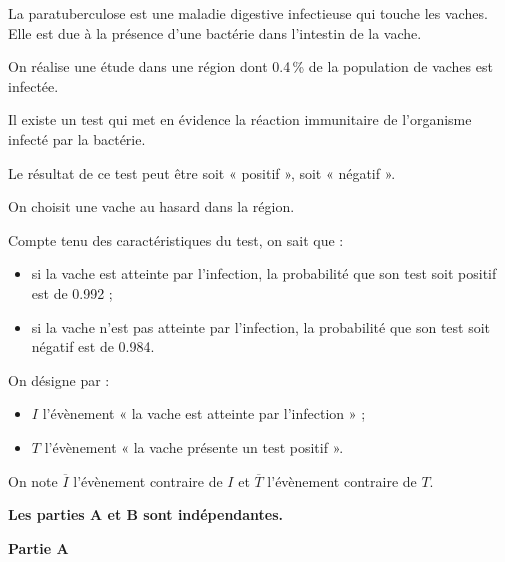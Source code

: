 La paratuberculose est une maladie digestive infectieuse qui touche les vaches. Elle est due à la présence d’une bactérie dans l’intestin de la vache.

On réalise une étude dans une région dont \num{0,4}\,\% de la population de vaches est infectée.

Il existe un test qui met en évidence la réaction immunitaire de l’organisme infecté par la bactérie.

Le résultat de ce test peut être soit « positif », soit « négatif ».

On choisit une vache au hasard dans la région.

Compte tenu des caractéristiques du test, on sait que :

\begin{itemize}
	\item si la vache est atteinte par l’infection, la probabilité que son test soit positif est de \num{0,992} ;
	\item si la vache n’est pas atteinte par l’infection, la probabilité que son test soit négatif est de \num{0,984}.
\end{itemize}

On désigne par :

\begin{itemize}
	\item $I$ l’évènement « la vache est atteinte par l’infection » ;
	\item $T$ l’évènement « la vache présente un test positif ».
\end{itemize}

On note $\overline{I}$ l’évènement contraire de $I$ et $\overline{T}$ l’évènement contraire de $T$.

\medskip

\textbf{Les parties A et B sont indépendantes.}

\medskip

\textbf{Partie A}

\smallskip

